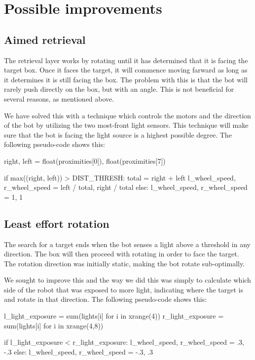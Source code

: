 \documentclass[a4paper,10pt]{article}
\begin{document}
\section{Possible improvements}
\label{sec:b1}

\subsection{Aimed retrieval}

The retrieval layer works by rotating until it has determined that it is 
facing the target box. Once it faces the target, it will commence moving 
farward as long as it determines it is still facing the box. The problem with 
this is that the bot will rarely push directly on the box, but with an angle.  
This is not beneficial for several reasons, as mentioned above.

We have solved this with a technique which controls the motors and the 
direction of the bot by utilizing the two most-front light sensors. This 
technique will make sure that the bot is facing the light source is a highest 
possible degree. The following pseudo-code shows this:

\begin{python}
right, left = float(proximities[0]), float(proximities[7])

if max((right, left)) > DIST_THRESH:
    total = right + left
    l_wheel_speed, r_wheel_speed = left / total, right / total
else:
    l_wheel_speed, r_wheel_speed = 1, 1
\end{python}

\subsection{Least effort rotation}

The search for a target ends when the bot senses a light above a threshold in 
any direction. The box will then proceed with rotating in order to face the 
target. The rotation direction was initially static, making the bot rotate 
sub-optimally.

We sought to improve this and the way we did this was simply to calculate 
which side of the robot that was exposed to more light, indicating where the 
target is and rotate in that direction. The following pseudo-code shows this:

\begin{python}
l_light_exposure = sum(lights[i] for i in xrange(4))
r_light_exposure = sum(lights[i] for i in xrange(4,8))

if l_light_exposure < r_light_exposure:
    l_wheel_speed, r_wheel_speed = .3, -.3
else:
    l_wheel_speed, r_wheel_speed = -.3, .3
\end{python}
\end{document}
